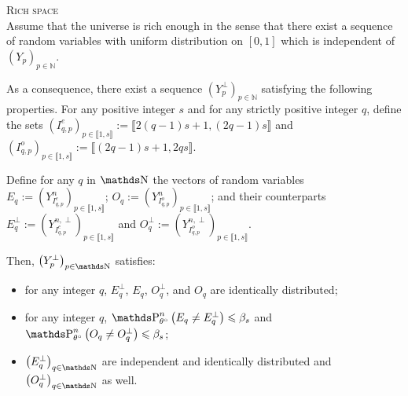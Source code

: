 \begin{as}{\textsc{Rich space \\}}\label{AS_DEPENDENTDATA_RICHSPACE}
Assume that the universe is rich enough in the sense that there exist a sequence of random variables with uniform distribution on $[0,1]$ which is independent of $(Y_{p})_{p \in \mathds{N}}$.

As a consequence, there exist a sequence $(Y_{p}^{\perp})_{p \in \mathds{N}}$ satisfying the following properties.
For any positive integer $s$ and for any strictly positive integer $q$, define the sets $(I_{q, p}^{e})_{p \in \llbracket 1, s\rrbracket} := \llbracket 2(q-1) s + 1, (2q - 1) s\rrbracket$ and $\left(I_{q, p}^{o}\right)_{p \in \llbracket 1, s \rrbracket} := \llbracket (2q-1) s + 1, 2q s\rrbracket$.

Define for any $q$ in $\N$ the vectors of random variables $E_{q} := (Y_{I_{q, p}^{e}}^{n})_{p \in \llbracket 1, s \rrbracket}$; $O_{q} := (Y_{I_{q, p}^{o}}^{n})_{p \in \llbracket 1, s \rrbracket}$; and their counterparts $E_{q}^{\perp} := (Y_{I_{q, p}^{e}}^{n, \perp})_{p \in \llbracket 1, s \rrbracket}$ and $O_{q}^{\perp} := (Y_{I_{q, p}^{o}}^{n, \perp})_{p \in \llbracket 1, s \rrbracket}$.

Then, $\left(Y^{\perp}_{p}\right)_{p \in \N}$ satisfies:
\begin{itemize}
\item for any integer $q$, $E^{\perp}_{q}$, $E_{q}$, $O^{\perp}_{q}$, and $O_{q}$ are identically distributed;
\item for any integer $q$, $\P_{\theta^{\circ}}^{n}\left(E_{q} \neq E^{\perp}_{q}\right) \leq \beta_{s}$ and $\P_{\theta^{\circ}}^{n}\left(O_{q} \neq O^{\perp}_{q}\right) \leq \beta_{s}$;
\item $\left(E^{\perp}_{q}\right)_{q \in \N}$ are independent and identically distributed and $\left(O^{\perp}_{q}\right)_{q \in \N}$ as well.
\end{itemize}
\end{as}



